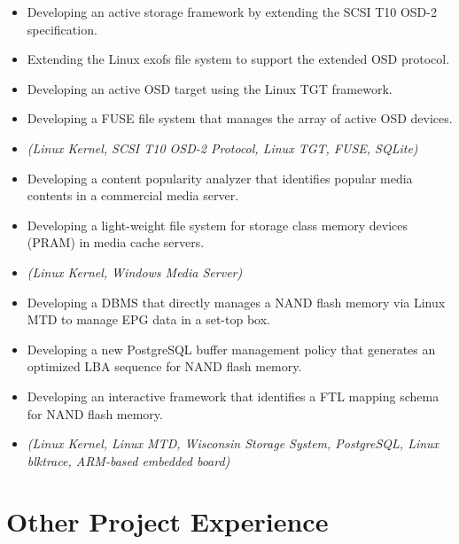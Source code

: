 \begin{itemize}
    \item {Developing an active storage framework by extending the SCSI T10 OSD-2
        specification.}
    \item {Extending the Linux exofs file system to support the extended OSD protocol.}
    \item {Developing an active OSD target using the Linux TGT framework.}
    \item {Developing a FUSE file system that manages the array of active OSD devices.}
    \item {\it\small(Linux Kernel, SCSI T10 OSD-2 Protocol, Linux TGT, FUSE, SQLite)}
\end{itemize}

\begin{itemize}
    \item {Developing a content popularity analyzer that identifies
        popular media contents in a commercial media server.}
    \item{Developing a light-weight file system for storage class memory devices (PRAM) in media cache servers.}
    \item{\it\small(Linux Kernel, Windows Media Server)}
\end{itemize}

\begin{itemize}
    \item{Developing a DBMS that directly manages a NAND flash memory
        via Linux MTD to manage EPG data in a set-top box.}
    \item{Developing a new PostgreSQL buffer management policy
        that generates an optimized LBA sequence for NAND flash memory.}
    \item{Developing an interactive framework that
        identifies a FTL mapping schema for NAND flash memory.}
    \item{\it\small(Linux Kernel, Linux MTD, Wisconsin Storage System, PostgreSQL,
        Linux blktrace, ARM-based embedded board)}
\end{itemize}

\section{Other Project Experience}

